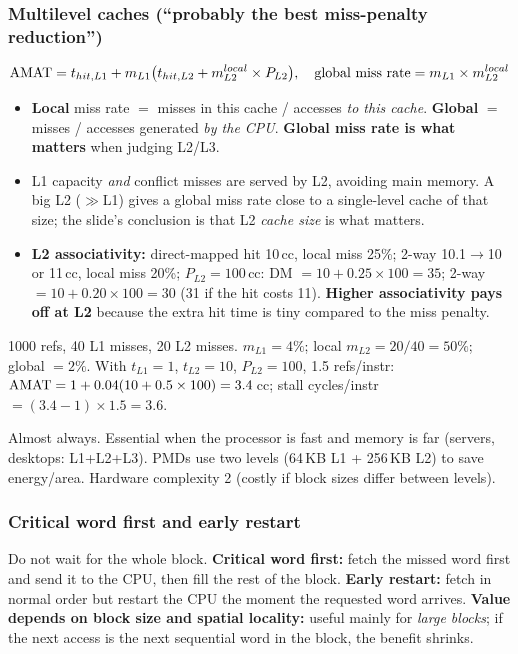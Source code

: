 \subsubsection{Multilevel caches (``probably the best miss-penalty reduction'')}
\[
\mathrm{AMAT}=t_{hit,L1}+m_{L1}\big(t_{hit,L2}+m_{L2}^{local}\times P_{L2}\big),\quad
\text{global miss rate}=m_{L1}\times m_{L2}^{local}
\]
\begin{itemize}
\item \textbf{Local} miss rate $=$ misses in this cache / accesses \emph{to this cache}. \textbf{Global} $=$ misses / accesses generated \emph{by the CPU}. \textbf{Global miss rate is what matters} when judging L2/L3.
\item L1 capacity \emph{and} conflict misses are served by L2, avoiding main memory. A big L2 ($\gg$L1) gives a global miss rate close to a single-level cache of that size; the slide's conclusion is that L2 \emph{cache size} is what matters.
\item \textbf{L2 associativity:} direct-mapped hit 10\,cc, local miss 25\%; 2-way 10.1$\to$10 or 11\,cc, local miss 20\%; $P_{L2}=100$\,cc: DM $=10+0.25\times100=35$; 2-way $=10+0.20\times100=30$ (31 if the hit costs 11). \textbf{Higher associativity pays off at L2} because the extra hit time is tiny compared to the miss penalty.
\end{itemize}
\begin{ex}
1000 refs, 40 L1 misses, 20 L2 misses. $m_{L1}=4\%$; local $m_{L2}=20/40=50\%$; global $=2\%$. With $t_{L1}=1$, $t_{L2}=10$, $P_{L2}=100$, 1.5 refs/instr: $\mathrm{AMAT}=1+0.04(10+0.5\times100)=3.4$\,cc; stall cycles/instr $=(3.4-1)\times1.5=3.6$.
\end{ex}
\begin{pick}
Almost always. Essential when the processor is fast and memory is far (servers, desktops: L1+L2+L3). PMDs use two levels (64\,KB L1 + 256\,KB L2) to save energy/area. Hardware complexity 2 (costly if block sizes differ between levels).
\end{pick}

\subsubsection{Critical word first and early restart}
Do not wait for the whole block. \textbf{Critical word first:} fetch the missed word first and send it to the CPU, then fill the rest of the block. \textbf{Early restart:} fetch in normal order but restart the CPU the moment the requested word arrives. \textbf{Value depends on block size and spatial locality:} useful mainly for \emph{large blocks}; if the next access is the next sequential word in the block, the benefit shrinks.

